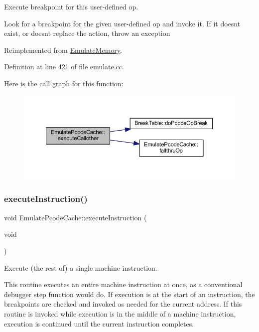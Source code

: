 Execute breakpoint for this user-\/defined op. 

Look for a breakpoint for the given user-\/defined op and invoke it. If it doesn\textquotesingle{}t exist, or doesn\textquotesingle{}t replace the action, throw an exception 

Reimplemented from \mbox{\hyperlink{class_emulate_memory_a9a7bbbdeb9ca7f696fb8070119eb304a}{Emulate\+Memory}}.



Definition at line 421 of file emulate.\+cc.

Here is the call graph for this function\+:
\nopagebreak
\begin{figure}[H]
\begin{center}
\leavevmode
\includegraphics[width=350pt]{class_emulate_pcode_cache_a5f90b72957b644a794455f051cb3ad2d_cgraph}
\end{center}
\end{figure}
\mbox{\label{class_emulate_pcode_cache_affaf407ab847a7ec409bac7d564c119c}} 
\subsubsection{\texorpdfstring{executeInstruction()}{executeInstruction()}}
{\footnotesize\ttfamily void Emulate\+Pcode\+Cache\+::execute\+Instruction (\begin{DoxyParamCaption}\item[{void}]{ }\end{DoxyParamCaption})}



Execute (the rest of) a single machine instruction. 

This routine executes an entire machine instruction at once, as a conventional debugger step function would do. If execution is at the start of an instruction, the breakpoints are checked and invoked as needed for the current address. If this routine is invoked while execution is in the middle of a machine instruction, execution is continued until the current instruction completes. 


